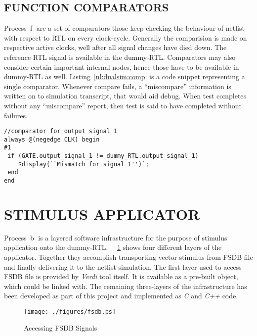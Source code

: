 \subsection{FUNCTION COMPARATORS}
Process~\textcircled{f} are a set of comparators those keep checking the behaviour of netlist with respect to RTL on every clock-cycle. Generally the comparision is made on respective active clocks, well after all signal changes have died down. The reference RTL signal is available in the dummy-RTL. Comparators may also consider certain important internal nodes, hence those have to be available in dummy-RTL as well. Listing~\ref{nl:dualsim:comp} is a code snippet representing a single comparator. Whenever compare fails, a ``miscompare'' information is written on to simulation transcript, that would aid debug. When test completes without any ``miscompare'' report, then test is said to have completed without failures.

\lstset{language=Verilog,
basicstyle=\footnotesize,
frame=shadowbox,
breaklines=true}          
\begin{lstlisting}[frame=single, caption=Cycle Based Comparison, label=nl:dualsim:comp ] 
//comparator for output signal 1 
always @(negedge CLK) begin
#1
 if (GATE.output_signal_1 != dummy_RTL.output_signal_1)
    $display(``Mismatch for signal 1'')`;
 end
end

\end{lstlisting}


\section{STIMULUS APPLICATOR}
\label{sec:dualsim:sa}
Process~\textcircled{b} is a layered software infrastructure for the purpose of stimulus application onto the dummy-RTL. ~\figurename{~\ref{fig:fsdb.ps}} shows four different layers of the applicator. Together they accomplish transporting vector stimulus from FSDB file and finally delivering it to the netlist simulation. The first layer used to access FSDB file is provided by {\it Verdi} tool itself. It is available as a pre-built object\cite{Verdi:FsdbReader}, which could be linked with. The remaining three-layers of the infrastructure has been developed as part of this project and implemented as {\it C} and {\it C++} code.

\begin{figure}[h]
\centering
\texttt{[image: ./figures/fsdb.ps]}
\caption{Accessing FSDB Signals}
\label{fig:fsdb.ps}
\end{figure}

